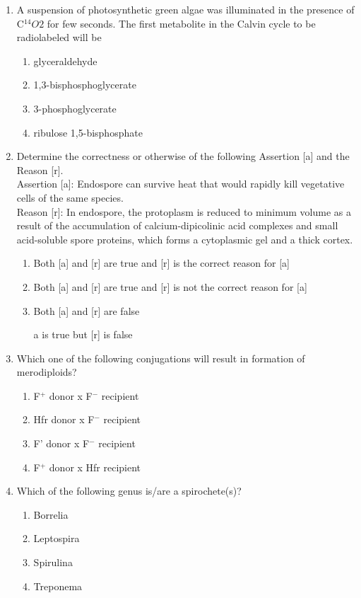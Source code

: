 \documentclass[journal,12pt,onecolumn]{IEEEtran}
\begin{document}
\begin{enumerate}
    \item A suspension of photosynthetic green algae was illuminated in the presence of C$^14O2$ for few seconds. The first metabolite in the Calvin cycle to be radiolabeled will be
    \begin{enumerate}
        \item glyceraldehyde
        \item 1,3-bisphosphoglycerate
        \item 3-phosphoglycerate
        \item ribulose 1,5-bisphosphate
    \end{enumerate}

    \item Determine the correctness or otherwise of the following Assertion [a] and the Reason [r].\\
    Assertion [a]: Endospore can survive heat that would rapidly kill vegetative cells of the same species.\\
    Reason [r]: In endospore, the protoplasm is reduced to minimum volume as a result of the accumulation of calcium-dipicolinic acid complexes and small acid-soluble spore proteins, which forms a cytoplasmic gel and a thick cortex.
    \begin{enumerate}
        \item Both [a] and [r] are true and [r] is the correct reason for [a]
        \item Both [a] and [r] are true and [r] is not the correct reason for [a]
        \item Both [a] and [r] are false
        \item [a] is true but [r] is false
    \end{enumerate}

    \item Which one of the following conjugations will result in formation of merodiploids?
    \begin{enumerate}
        \item F$^+$ donor x F$^-$ recipient
        \item Hfr donor x F$^-$ recipient
        \item F' donor x F$^-$ recipient
        \item F$^+$ donor x Hfr recipient
    \end{enumerate}

    \item Which of the following genus is/are a spirochete(s)?
    \begin{enumerate}
        \item Borrelia
        \item Leptospira
        \item Spirulina
        \item Treponema
    \end{enumerate}


\end{enumerate}
\end{document}
